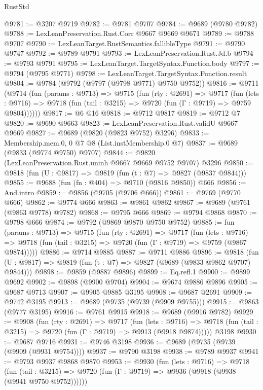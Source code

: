 \begin{lexlean}{RustStd}
\begin{coremodule}
@9781 := @3207 @9719
@9782 := @9781 @9707
@9784 := @9689 (@9780 @9782)
@9788 := LexLeanPreservation.Rust.Corr @9667 @9669 @9671
@9789 := @9788 @9707
@9790 := LexLeanTarget.RustSemantics.fallibleType
@9791 := @9790 @9747
@9792 := @9789 @9791
@9793 := LexLeanPreservation.Rust.Jd.b
@9794 := @9793 @9791
@9795 := LexLeanTarget.TargetSyntax.Function.body
@9797 := @9794 (@9795 @9771)
@9798 := LexLeanTarget.TargetSyntax.Function.result
@9804 := @9784 (@9792 (@9797 (@9798 @9771) @9750 @9752))
@9816 := @9711
    (@9714
      (fun (params : @9713) =>
      @9715
        (fun (rty : @2691) =>
        @9717
          (fun (lets : @9716) =>
          @9718 (fun (tail : @3215) => @9720 (fun (Γ : @9719) => @9759 @9804))))))
@9817 := @6 @16
@9818 := @9712 @9817
@9819 := @9712 @7
@9820 := @9690 @9663
@9823 := LexLeanPreservation.Rust.validU @9667 @9669
@9827 := @9689 (@9820 (@9823 @9752) @3296)
@9833 := Membership.mem.{0, 0} @7 @8 (List.instMembership.{0} @7)
@9837 := @9689 (@9833 (@9774 @9750) @9707)
@9844 := @9820 (LexLeanPreservation.Rust.uninh @9667 @9669 @9752 @9707) @3296
@9850 := @9818 (fun (U : @9817) => @9819 (fun (t : @7) => @9827 (@9837 @9844)))
@9855 := @9688 (fun (fn : @404) => @9710 (@9816 @9850)) @666
@9856 := And.intro
@9859 := @9856 (@9705 (@9706 @666))
@9861 := @9769 (@9770 @666)
@9862 := @9774 @666
@9863 := @9861 @9862
@9867 := @9689 (@9761 (@9863 @9778) @9782)
@9868 := @9795 @666
@9869 := @9794 @9868
@9870 := @9798 @666
@9874 := @9792 (@9869 @9870 @9750 @9752)
@9885 := fun (params : @9713) =>
  @9715
    (fun (rty : @2691) =>
    @9717
      (fun (lets : @9716) =>
      @9718 (fun (tail : @3215) => @9720 (fun (Γ : @9719) => @9759 (@9867 @9874)))))
@9886 := @9714 @9885
@9887 := @9711 @9886
@9896 := @9818 (fun (U : @9817) => @9819 (fun (t : @7) => @9827 (@9689 (@9833 @9862 @9707) @9844)))
@9898 := @9859 (@9887 @9896)
@9899 := Eq.refl.{1}
@9900 := @9899 @9692
@9902 := @9898 (@9900 @9704)
@9904 := @9674 @9886 @9896
@9905 := @9687 @9713
@9907 := @9905 @9885 @3195
@9908 := @9687 @2691
@9909 := @9742 @3195
@9913 := @9689 (@9735 (@9739 (@9909 @9755)))
@9915 := @9863 (@9777 @3195)
@9916 := @9761 @9915
@9918 := @9689 (@9916 @9782)
@9929 := @9908
    (fun (rty : @2691) =>
    @9717
      (fun (lets : @9716) =>
      @9718 (fun (tail : @3215) => @9720 (fun (Γ : @9719) => @9913 (@9918 @9874)))))
    @3198
@9930 := @9687 @9716
@9931 := @9746 @3198
@9936 := @9689 (@9735 (@9739 (@9909 (@9931 @9754))))
@9937 := @9790 @3198
@9938 := @9789 @9937
@9941 := @9793 @9937 @9868 @9870
@9953 := @9930
    (fun (lets : @9716) =>
    @9718
      (fun (tail : @3215) => @9720 (fun (Γ : @9719) => @9936 (@9918 (@9938 (@9941 @9750 @9752))))))

\end{coremodule}
\end{lexlean}

